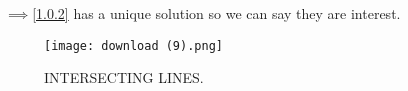 \documentclass[journal,12pt,twocolumn]{IEEEtran}
\begin{document}
\begin{enumerate}
$\implies$\eqref{1.0.2} has a unique solution so we can say they are interest.


\begin{figure}[ht]
    \centering
   \texttt{[image: download (9).png]}
    \caption{INTERSECTING LINES.}
    \label{fig: INTERSECTING LINES.}
\end{figure}    
\end{enumerate}
\end{document}
